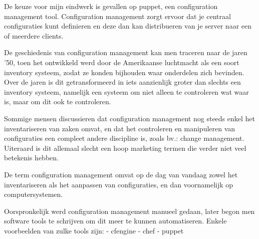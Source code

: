 
De keuze voor mijn eindwerk is gevallen op puppet, een configuration management tool. Configuration management zorgt ervoor dat je centraal configuraties kunt definieren en deze dan kan distribueren van je server naar een of meerdere clients.



De geschiedenis van configuration management kan men traceren naar de jaren '50, toen het ontwikkeld werd door de Amerikaanse luchtmacht als een soort inventory systeem, zodat ze konden bijhouden waar onderdelen zich bevinden.
Over de jaren is dit getransformeerd in iets aanzienlijk groter dan slechts een inventory systeem,
namelijk een systeem om niet alleen te controleren wat waar is, maar om dit ook te controleren.

Sommige mensen discussieren dat configuration management nog steeds enkel het inventariseren van zaken omvat,
en dat het controleren en manipuleren van configuraties een compleet andere discipline is, zoals bv.: change management.
Uiteraard is dit allemaal slecht een hoop marketing termen die verder niet veel betekenis hebben.

De term configuration management omvat op de dag van vandaag zowel het inventariseren als het aanpassen van configuraties, en dan  voornamelijk op computersystemen.

Oorspronkelijk werd configuration management manueel gedaan, later begon men software tools te schrijven om dit meer te kunnen automatiseren.
Enkele voorbeelden van zulke tools zijn:
	- cfengine
	- chef
	- puppet
